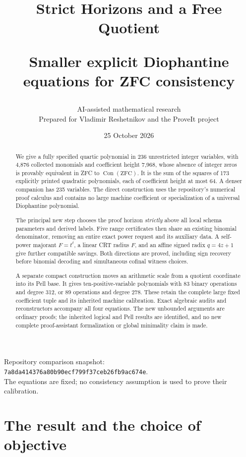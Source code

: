\documentclass[11pt]{article}
\title{\color{ink}\bfseries Strict Horizons and a Free Quotient\par
\large Smaller explicit Diophantine equations for ZFC consistency}
\author{AI-assisted mathematical research\smallskip\\
\normalsize Prepared for Vladimir Reshetnikov and the ProveIt project}
\date{25 October 2026}
\theoremstyle{definition}
\newcommand{\Con}{\operatorname{Con}}
\begin{document}
\maketitle
\thispagestyle{empty}
\begin{abstract}
We give a fully specified quartic polynomial in 236 unrestricted integer
variables, with 4,876 collected monomials and coefficient height 7,968,
whose absence of integer zeros is provably equivalent in ZFC to
$\Con(\mathrm{ZFC})$. It is the sum of the squares of 173 explicitly
printed quadratic polynomials, each of coefficient height at most 64.
A denser companion has 235 variables. The direct construction uses the
repository's numerical proof calculus and contains no large machine
coefficient or specialization of a universal Diophantine polynomial.

The principal new step chooses the proof horizon \emph{strictly} above
all local schema parameters and derived labels. Five range certificates
then share an existing binomial denominator, removing an entire exact
power request and its auxiliary data. A self-power majorant $F=t^t$,
a linear CRT radius $F$, and an affine signed radix $q=4z+1$ give further
compatible savings. Both directions are proved, including sign recovery
before binomial decoding and simultaneous cofinal witness choices.

A separate compact construction moves an arithmetic scale from a quotient
coordinate into its Pell base. It gives ten-positive-variable polynomials
with 83 binary operations and degree 312, or 89 operations and degree 278.
These retain the complete large fixed coefficient tuple and its inherited
machine calibration. Exact algebraic audits and reconstructors accompany
all four equations. The new unbounded arguments are ordinary proofs;
the inherited logical and Pell results are identified, and no new complete
proof-assistant formalization or global minimality claim is made.
\end{abstract}
\vfill
\begin{center}\small
Repository comparison snapshot:\\
\texttt{7a8da414376a80b90ecf799f37ceb26fb9ac674e}.\\
The equations are fixed; no consistency assumption is used to prove their calibration.
\end{center}
\newpage
\tableofcontents
\newpage

\section{The result and the choice of objective}
\label{sec:result}
\end{document}
